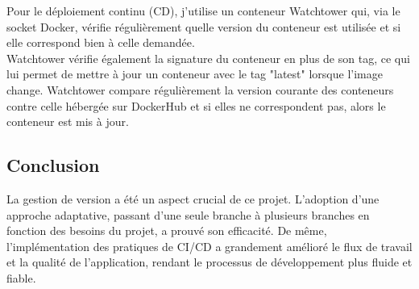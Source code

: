 Pour le déploiement continu (CD), j'utilise un conteneur Watchtower qui, via le socket Docker,
vérifie régulièrement quelle version du conteneur est utilisée et si elle correspond bien à celle demandée.\\

Watchtower vérifie également la signature du conteneur en plus de son tag,
ce qui lui permet de mettre à jour un conteneur avec le tag "latest" lorsque l'image change.
Watchtower compare régulièrement la version courante des conteneurs contre celle hébergée sur DockerHub et si elles ne correspondent pas,
alors le conteneur est mis à jour.

\subsection{Conclusion}\label{subsec:conclusion}

La gestion de version a été un aspect crucial de ce projet.
L'adoption d'une approche adaptative, passant d'une seule branche à plusieurs branches en fonction des besoins du projet, a prouvé son efficacité.
De même, l'implémentation des pratiques de CI/CD a grandement amélioré le flux de travail et la qualité de
l'application, rendant le processus de développement plus fluide et fiable.
